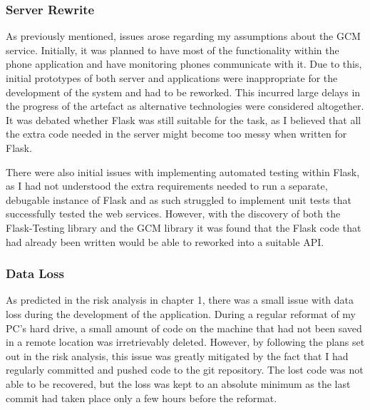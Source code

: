 \subsubsection{Server Rewrite}
As previously mentioned, issues arose regarding my assumptions about the GCM service.
Initially, it was planned to have most of the functionality within the phone application and have monitoring phones communicate with it.
Due to this, initial prototypes of both server and applications were inappropriate for the development of the system and had to be reworked.
This incurred large delays in the progress of the artefact as alternative technologies were considered altogether.
It was debated whether Flask was still suitable for the task, as I believed that all the extra code needed in the server might become too messy when written for Flask.

There were also initial issues with implementing automated testing within Flask, as I had not understood the extra requirements needed to run a separate, debugable instance of Flask and as such struggled to implement unit tests that successfully tested the web services.
However, with the discovery of both the Flask-Testing library and the GCM library it was found that the Flask code that had already been written would be able to reworked into a suitable API.

\subsubsection{Data Loss}
As predicted in the risk analysis in chapter 1, there was a small issue with data loss during the development of the application.
During a regular reformat of my PC's hard drive, a small amount of code on the machine that had not been saved in a remote location was irretrievably deleted.
However, by following the plans set out in the risk analysis, this issue was greatly mitigated by the fact that I had regularly committed and pushed code to the git repository. 
The lost code was not able to be recovered, but the loss was kept to an absolute minimum as the last commit had taken place only a few hours before the reformat.
